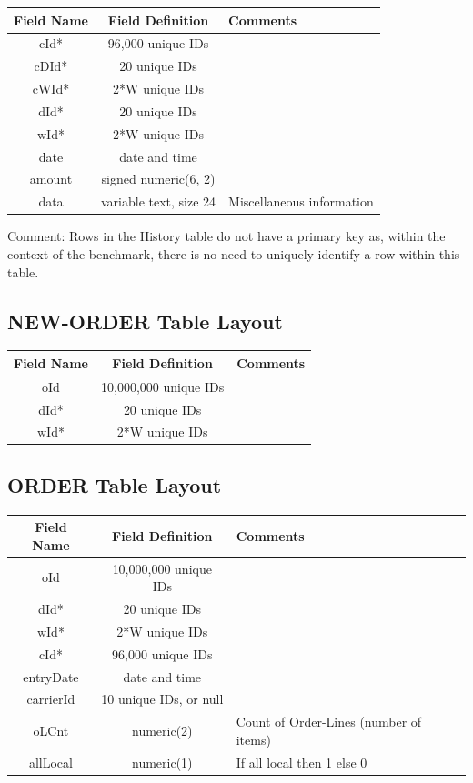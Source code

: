 \begin{center}
\begin{tabular}{ |c|c|m{7.5cm}| } 
 \hline
 Field Name & Field Definition & Comments \\ 
 \hline
 cId* & 96,000 unique IDs &\\

 cDId* & 20 unique IDs &\\

 cWId* & 2*W unique IDs & \\ 
 dId* & 20 unique IDs & \\
 wId* & 2*W unique IDs & \\ 
 date & date and time & \\
 amount & signed numeric(6, 2) & \\
 data & variable text, size 24 & Miscellaneous information \\
 \hline
\end{tabular}
\end{center}
Comment: Rows in the History table do not have a primary key as, within the context of the benchmark, there is no need to uniquely identify a row within this table. 

\subsection{NEW-ORDER Table Layout}

\begin{center}
\begin{tabular}{ |c|c|m{7.5cm}| } 
 \hline
 Field Name & Field Definition & Comments \\ 
 \hline
 \rowcolor{gray}
 oId & 10,000,000 unique IDs & \\
 dId* & 20 unique IDs &\\
 wId* & 2*W unique IDs & \\ 
 \hline
\end{tabular}
\end{center}

\subsection{ORDER Table Layout}

\begin{center}
\begin{tabular}{ |c|c|m{7.5cm}| } 
 \hline
 Field Name & Field Definition & Comments \\ 
 \hline
 \rowcolor{gray}
 oId & 10,000,000 unique IDs & \\
 \rowcolor{gray}
 dId* & 20 unique IDs & \\
 \rowcolor{gray}
 wId* & 2*W unique IDs & \\ 
 cId* & 96,000 unique IDs & \\
 entryDate & date and time & \\
 carrierId & 10 unique IDs, or null & \\
 oLCnt & numeric(2) & Count of Order-Lines (number of items) \\
 allLocal & numeric(1) & If all local then 1 else 0\\
 \hline
\end{tabular}
\end{center}


